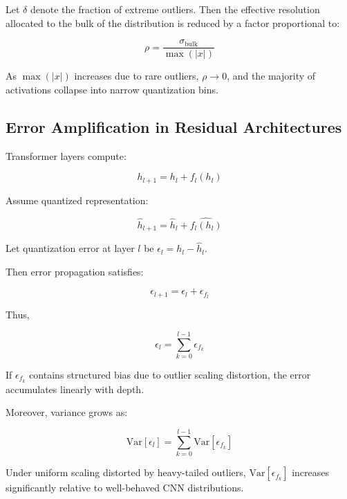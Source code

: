 \documentclass[conference]{IEEEtran}
\begin{document}
Let $\delta$ denote the fraction of extreme outliers. Then the effective resolution allocated to the bulk of the distribution is reduced by a factor proportional to:

\begin{equation}
\rho = \frac{\sigma_{\text{bulk}}}{\max(|x|)}
\end{equation}

As $\max(|x|)$ increases due to rare outliers, $\rho \to 0$, and the majority of activations collapse into narrow quantization bins.

\subsection{Error Amplification in Residual Architectures}

Transformer layers compute:

\begin{equation}
h_{l+1} = h_l + f_l(h_l)
\end{equation}

Assume quantized representation:

\begin{equation}
\hat{h}_{l+1} = \hat{h}_l + \widehat{f_l(h_l)}
\end{equation}

Let quantization error at layer $l$ be $\epsilon_l = h_l - \hat{h}_l$.

Then error propagation satisfies:

\begin{equation}
\epsilon_{l+1} = \epsilon_l + \epsilon_{f_l}
\end{equation}

Thus,

\begin{equation}
\epsilon_{l} = \sum_{k=0}^{l-1} \epsilon_{f_k}
\end{equation}

If $\epsilon_{f_k}$ contains structured bias due to outlier scaling distortion, the error accumulates linearly with depth.

Moreover, variance grows as:

\begin{equation}
\mathrm{Var}[\epsilon_l] = \sum_{k=0}^{l-1} \mathrm{Var}[\epsilon_{f_k}]
\end{equation}

Under uniform scaling distorted by heavy-tailed outliers, $\mathrm{Var}[\epsilon_{f_k}]$ increases significantly relative to well-behaved CNN distributions.
\end{document}
